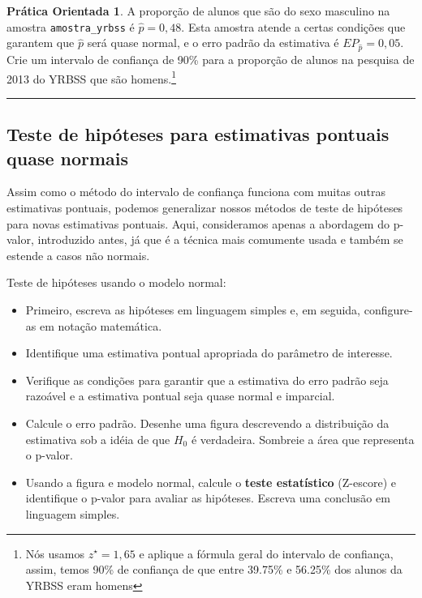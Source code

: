 \documentclass[
]{book}
\theoremstyle{definition}
\theoremstyle{definition}
\theoremstyle{definition}
\newtheorem{exercise}{Prática Orientada}[chapter]
\theoremstyle{definition}
\theoremstyle{remark}
\begin{document}
\begin{exercise}
\protect\hypertarget{exr:unnamed-chunk-183}{}{\label{exr:unnamed-chunk-183} }A proporção de alunos que são do sexo masculino na amostra \texttt{amostra\_yrbss} é \(\hat{p} = 0,48\). Esta amostra atende a certas condições que garantem que \(\hat{p}\) será quase normal, e o erro padrão da estimativa é \(EP_{\hat{p}} = 0,05\). Crie um intervalo de confiança de 90\% para a proporção de alunos na pesquisa de 2013 do YRBSS que são homens.\footnote{Nós usamos \(z^{\star}=1,65\) e aplique a fórmula geral do intervalo de confiança, assim, temos 90\% de confiança de que entre 39.75\% e 56.25\% dos alunos da YRBSS eram homens}
\end{exercise}

\begin{center}\rule{0.5\linewidth}{0.5pt}\end{center}

\hypertarget{HTPointEstimatesAlmostNormal}{%
\subsection{Teste de hipóteses para estimativas pontuais quase normais}\label{HTPointEstimatesAlmostNormal}}

Assim como o método do intervalo de confiança funciona com muitas outras estimativas pontuais, podemos generalizar nossos métodos de teste de hipóteses para novas estimativas pontuais. Aqui, consideramos apenas a abordagem do p-valor, introduzido antes, já que é a técnica mais comumente usada e também se estende a casos não normais.

Teste de hipóteses usando o modelo normal:

\begin{itemize}
\item
  Primeiro, escreva as hipóteses em linguagem simples e, em seguida, configure-as em notação matemática.
\item
  Identifique uma estimativa pontual apropriada do parâmetro de interesse.
\item
  Verifique as condições para garantir que a estimativa do erro padrão seja razoável e a estimativa pontual seja quase normal e imparcial.
\item
  Calcule o erro padrão. Desenhe uma figura descrevendo a distribuição da estimativa sob a idéia de que \(H_0\) é verdadeira. Sombreie a área que representa o p-valor.
\item
  Usando a figura e modelo normal, calcule o \textbf{teste estatístico} (Z-escore) e identifique o p-valor para avaliar as hipóteses. Escreva uma conclusão em linguagem simples.
\end{itemize}
\end{document}
